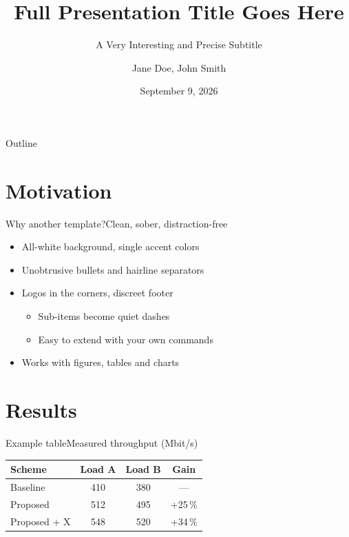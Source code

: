 \documentclass[aspectratio=169,10pt]{beamer}
\title[Short Title]{Full Presentation Title Goes Here}
\subtitle[Short Subtitle]{A Very Interesting and Precise Subtitle}
\author[Doe \& Smith]{Jane Doe, John Smith}
\date[09.09.2026]{September 9, 2026}
\begin{document}

\begin{frame}[plain]
  \titlepage
\end{frame}

\begin{frame}{Outline}
  \tableofcontents[hideallsubsections]
\end{frame}

\section{Motivation}
\begin{frame}{Why another template?}{Clean, sober, distraction-free}
  \begin{itemize}
    \item All-white background, single accent colors
    \item Unobtrusive bullets and hairline separators
    \item Logos in the corners, discreet footer
      \begin{itemize}
        \item Sub-items become quiet dashes
        \item Easy to extend with your own commands
      \end{itemize}
    \item Works with figures, tables and charts
  \end{itemize}
\end{frame}

\section{Results}
\begin{frame}{Example table}{Measured throughput (Mbit/s)}
  \begin{table}
    \centering
    \begin{tabular}{lccc}
      \toprule
      \textcolor{accent}{\textbf{Scheme}} &
      \textcolor{accent}{\textbf{Load A}} &
      \textcolor{accent}{\textbf{Load B}} &
      \textcolor{accenthesso}{\textbf{Gain}} \\
      \midrule
      Baseline      & 410 & 380 & --- \\
      Proposed      & 512 & 495 & +25\,\% \\
      Proposed + X  & 548 & 520 & +34\,\% \\
      \bottomrule
    \end{tabular}
  \end{table}
\end{frame}
\end{document}
